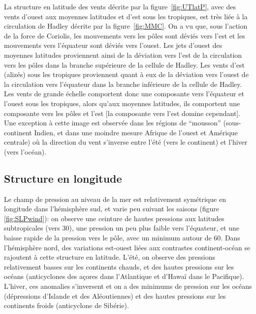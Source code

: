 
\sk
La structure en latitude des vents décrite par la figure~\ref{fig:UTlatP}, avec des vents d'ouest aux moyennes latitudes et d'est sous les tropiques, est très liée à la circulation de Hadley décrite par la figure~\ref{fig:MMC}. On a vu que, sous l'action de la force de Coriolis, les mouvements vers les pôles sont déviés vers l'est et les mouvements vers l'équateur sont déviés vers l'ouest. Les jets d'ouest des moyennes latitudes proviennent ainsi de la déviation vers l'est de la circulation vers les pôles dans la branche supérieure de la cellule de Hadley. Les vents d'est (alizés) sous les tropiques proviennent quant à eux de la déviation vers l'ouest de la circulation vers l'équateur dans la branche inférieure de la cellule de Hadley. Les vents de grande échelle comportent donc une composante vers l'équateur et l'ouest sous les tropiques, alors qu'aux moyennes latitudes, ils comportent une composante vers les pôles et l'est [la composante vers l'est domine cependant]. Une exception à cette image est observée dans les régions de ``mousson'' (sous-continent Indien, et dans une moindre mesure Afrique de l'ouest et Amérique centrale) où la direction du vent s'inverse entre l'été (vers le continent) et l'hiver (vers l'océan).

\sk
\subsection{Structure en longitude}

\sk
Le champ de pression au niveau de la mer est relativement symétrique en longitude dans l'hémisphère sud, et varie peu suivant les saisons (figure \ref{fig:SLPwind}): on observe une ceinture de hautes pressions aux latitudes subtropicales (vers 30\deg), une pression un peu plus faible vers l'équateur, et une baisse rapide de la pression vers le pôle, avec un minimum autour de 60\deg. Dans l'hémisphère nord, des variations est-ouest liées aux contrastes continent-océan se rajoutent à cette structure en latitude. L'été, on observe des pressions relativement basses sur les continents chauds, et des hautes pressions sur les océans (anticyclones des açores dans l'Atlantique et d'Hawaï dans le Pacifique). L'hiver, ces anomalies s'inversent et on a des minimums de pression sur les océans (dépressions d'Islande et des Aléoutiennes) et des hautes pressions sur les continents froids (anticyclone de Sibérie).

